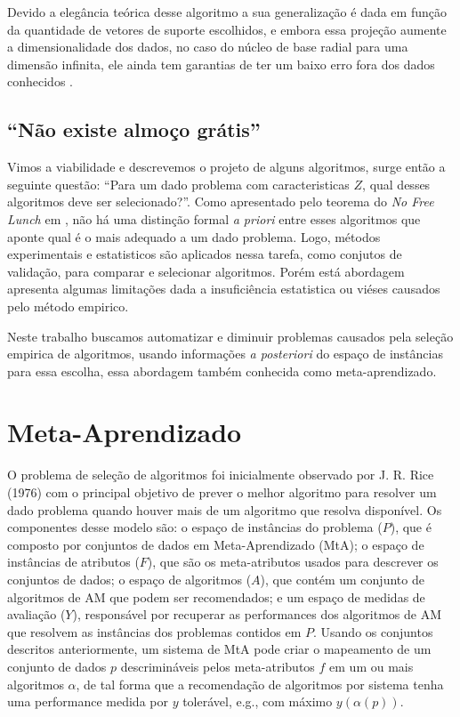 Devido a elegância teórica desse algoritmo a sua generalização é dada em função
da quantidade de vetores de suporte escolhidos, e embora essa projeção aumente
a dimensionalidade dos dados, no caso do núcleo de base radial para uma
dimensão infinita, ele ainda tem garantias de ter um baixo erro fora dos dados
conhecidos \cite{vapnik2013nature}.

\subsection{``Não existe almoço grátis''}
Vimos a viabilidade e descrevemos o projeto de alguns algoritmos, surge então a
seguinte questão: ``Para um dado problema com caracteristicas $Z$, qual desses
algoritmos deve ser selecionado?''. Como apresentado pelo teorema do \textit{No
Free Lunch} em \cite{wolpert1997no,wolpert1996lack}, não há uma distinção
formal \textit{a priori} entre esses algoritmos que aponte qual é o mais
adequado a um dado problema. Logo, métodos experimentais e estatisticos são
aplicados nessa tarefa, como conjutos de validação, para comparar e selecionar
algoritmos. Porém está abordagem apresenta algumas limitações dada a
insuficiência estatistica ou viéses causados pelo método empirico.

Neste trabalho buscamos automatizar e diminuir problemas causados pela seleção
empirica de algoritmos, usando informações \textit{a posteriori} do espaço de
instâncias para essa escolha, essa abordagem também conhecida como
meta-aprendizado.

\section{Meta-Aprendizado}
\label{sec:metalearning}
O problema de seleção de algoritmos foi inicialmente observado por J. R. Rice
(1976) \cite{Rice1976} com o principal objetivo de prever o melhor algoritmo
para resolver um dado problema quando houver mais de um algoritmo que resolva
disponível.
Os componentes desse modelo são: o espaço de instâncias do problema ($P$), que
é composto por conjuntos de dados em Meta-Aprendizado (MtA); o espaço de
instâncias de atributos ($F$), que são os meta-atributos usados para descrever
os conjuntos de dados; o espaço de algoritmos ($A$), que contém um conjunto de
algoritmos de AM que podem ser recomendados; e um espaço de medidas de
avaliação ($Y$), responsável por recuperar as performances dos algoritmos de AM
que resolvem as instâncias dos problemas contidos em $P$.
Usando os conjuntos descritos anteriormente, um sistema de MtA pode criar o
mapeamento de um conjunto de dados $p$ descrimináveis pelos meta-atributos $f$
em um ou mais algoritmos $\alpha$, de tal forma que a recomendação de
algoritmos por sistema tenha uma performance medida por $y$ tolerável, e.g.,
com máximo $y(\alpha(p))$.

